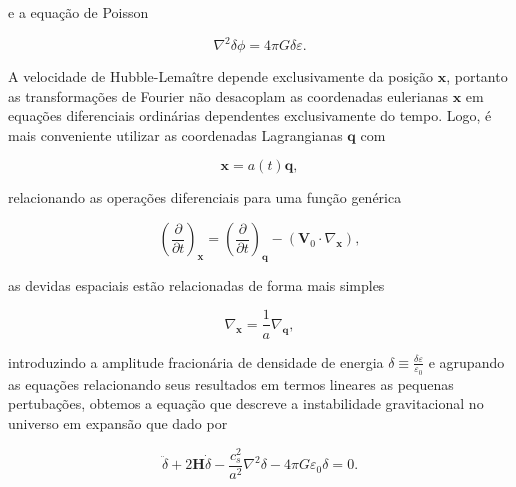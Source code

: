 e a equação de Poisson

\begin{equation}\label{eq26}
	\nabla^2\delta\phi = 4\pi G\delta\varepsilon.
\end{equation}

A velocidade de Hubble-Lemaître depende exclusivamente da posição $ \mathbf{x} $, portanto as transformações de Fourier não desacoplam as coordenadas eulerianas $ \mathbf{x} $ em equações diferenciais ordinárias dependentes exclusivamente do tempo. Logo, é mais conveniente utilizar as coordenadas Lagrangianas $ \mathbf{q} $ com  

\begin{equation}\label{eq27}
	\mathbf{x} = a(t)\mathbf{q},
\end{equation}

relacionando as operações diferenciais para uma função genérica 

\begin{equation}\label{eq28}
	\left(\dfrac{\partial}{\partial t}\right)_\mathbf{x} = \left( \dfrac{\partial}{\partial t} \right)_\mathbf{q} - (\mathbf{V}_0 \cdot \nabla_\mathbf{x}),
\end{equation}
 
as devidas espaciais estão relacionadas de forma mais simples

\begin{equation}\label{eq29}
	\nabla_\mathbf{x} = \dfrac{1}{a}\nabla_\mathbf{q},
\end{equation}

 introduzindo a amplitude fracionária de densidade de energia $ \delta \equiv \frac{\delta\varepsilon}{\varepsilon_0} $ e agrupando as equações relacionando seus resultados em termos lineares as pequenas pertubações, obtemos a equação que descreve a instabilidade gravitacional no universo em expansão que dado por
 
 \begin{equation}\label{eq30}
 	\ddot{\delta} + 2\mathbf{H}\dot{\delta} - \dfrac{c^2_s}{a^2}\nabla^2\delta - 4\pi G\varepsilon_0\delta = 0.
 \end{equation}







